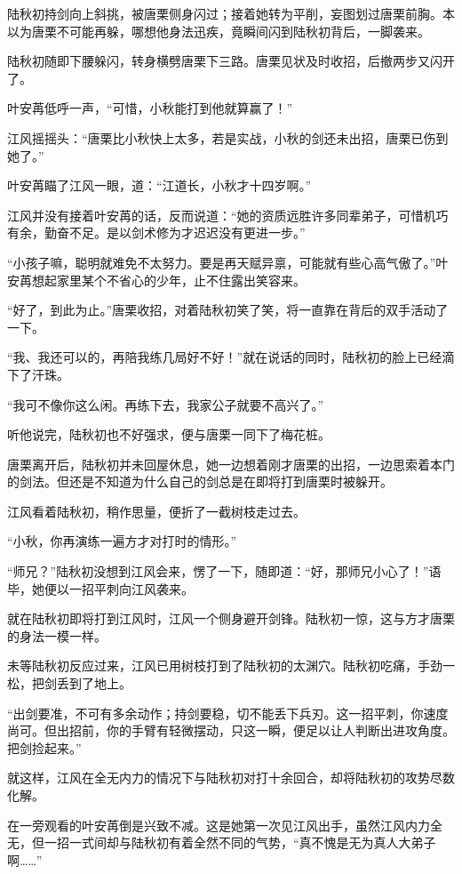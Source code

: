 陆秋初持剑向上斜挑，被唐栗侧身闪过；接着她转为平削，妄图划过唐栗前胸。本以为唐栗不可能再躲，哪想他身法迅疾，竟瞬间闪到陆秋初背后，一脚袭来。

陆秋初随即下腰躲闪，转身横劈唐栗下三路。唐栗见状及时收招，后撤两步又闪开了。

叶安苒低呼一声，“可惜，小秋能打到他就算赢了！”

江风摇摇头：“唐栗比小秋快上太多，若是实战，小秋的剑还未出招，唐栗已伤到她了。”

叶安苒瞄了江风一眼，道：“江道长，小秋才十四岁啊。”

江风并没有接着叶安苒的话，反而说道：“她的资质远胜许多同辈弟子，可惜机巧有余，勤奋不足。是以剑术修为才迟迟没有更进一步。”

“小孩子嘛，聪明就难免不太努力。要是再天赋异禀，可能就有些心高气傲了。”叶安苒想起家里某个不省心的少年，止不住露出笑容来。

“好了，到此为止。”唐栗收招，对着陆秋初笑了笑，将一直靠在背后的双手活动了一下。

“我、我还可以的，再陪我练几局好不好！”就在说话的同时，陆秋初的脸上已经滴下了汗珠。

“我可不像你这么闲。再练下去，我家公子就要不高兴了。”

听他说完，陆秋初也不好强求，便与唐栗一同下了梅花桩。

唐栗离开后，陆秋初并未回屋休息，她一边想着刚才唐栗的出招，一边思索着本门的剑法。但还是不知道为什么自己的剑总是在即将打到唐栗时被躲开。

江风看着陆秋初，稍作思量，便折了一截树枝走过去。

“小秋，你再演练一遍方才对打时的情形。”

“师兄？”陆秋初没想到江风会来，愣了一下，随即道：“好，那师兄小心了！”语毕，她便以一招平刺向江风袭来。

就在陆秋初即将打到江风时，江风一个侧身避开剑锋。陆秋初一惊，这与方才唐栗的身法一模一样。

未等陆秋初反应过来，江风已用树枝打到了陆秋初的太渊穴。陆秋初吃痛，手劲一松，把剑丢到了地上。

“出剑要准，不可有多余动作；持剑要稳，切不能丢下兵刃。这一招平刺，你速度尚可。但出招前，你的手臂有轻微摆动，只这一瞬，便足以让人判断出进攻角度。把剑捡起来。”

就这样，江风在全无内力的情况下与陆秋初对打十余回合，却将陆秋初的攻势尽数化解。

在一旁观看的叶安苒倒是兴致不减。这是她第一次见江风出手，虽然江风内力全无，但一招一式间却与陆秋初有着全然不同的气势，“真不愧是无为真人大弟子啊……”

